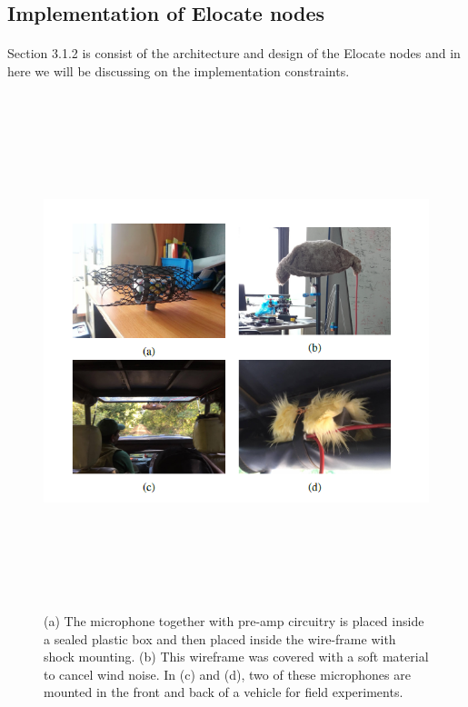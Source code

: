 \documentclass[12pt]{article}
\numberwithin{figure}{section}
\numberwithin{table}{section}
\begin{document}
\subsection{Implementation of Elocate nodes}
\paragraph{}
Section 3.1.2 is consist of the architecture and design of the Elocate nodes and in here we will be discussing on the implementation constraints. 

\begin{figure}[H]
\centering
\includegraphics[width=12cm,height=15cm,keepaspectratio]{eloc_implementation.png}
\caption{(a) The microphone together with pre-amp circuitry
is placed inside a sealed plastic box and then placed
inside the wire-frame with shock mounting. (b) This wireframe
was covered with a soft material to cancel wind noise.
In (c) and (d), two of these microphones are mounted in the
front and back of a vehicle for field experiments.}
\label{figure:eloc}
\end{figure}
\end{document}
